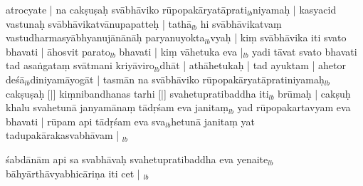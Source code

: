 \documentclass[article,12pt,a4paper]{memoir}%
\newcounter{parCount}
\begin{document}
	  
	  \pstart \leavevmode%
	atrocyate | na cakṣuṣaḥ svābhāviko rūpopakāryatāprati{\tiny $_{lb}$}niyamaḥ | kasyacid vastunaḥ svābhāvikatvānupapatteḥ | tathā{\tiny $_{lb}$} hi svābhāvikatvaṃ vastudharmasyābhyanujānānāḥ paryanuyokta{\tiny $_{lb}$}vyaḥ | kiṃ svābhāvika iti svato bhavati | āhosvit parato{\tiny $_{lb}$} bhavati | kiṃ vāhetuka eva |{\tiny $_{lb}$} yadi tāvat svato bhavati tad asaṅgataṃ svātmani kriyāviro{\tiny $_{lb}$}dhāt | athāhetukaḥ | tad ayu\leavevmode{}ktam | ahetor deśā{\tiny $_{lb}$}diniyamāyogāt | tasmān na svābhāviko rūpopakāryatāpratiniyamaḥ{\tiny $_{lb}$} cakṣuṣaḥ [|] kiṃnibandhanas tarhi [|] svahetupratibaddha iti{\tiny $_{lb}$} brūmaḥ | cakṣuḥ khalu svahetunā janyamānaṃ tādṛśam eva janitaṃ{\tiny $_{lb}$} yad rūpopakartavyam eva bhavati | rūpam api tādṛśam eva sva{\tiny $_{lb}$}hetunā janitaṃ yat tadupakārakasvabhāvam |
	{}
	\pend%
      {\tiny $_{lb}$}

	  
	  \pstart \leavevmode%
	śabdānām api sa svabhāvaḥ svahetupratibaddha eva yenaite{\tiny $_{lb}$} bāhyārthāvyabhicāriṇa iti cet |
	{}
	\pend%
      {\tiny $_{lb}$}
\end{document}

